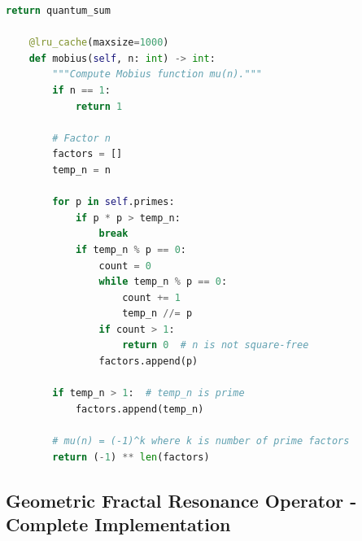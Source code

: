 \documentclass[11pt,a4paper]{article}
\theoremstyle{plain}
\theoremstyle{definition}
\theoremstyle{remark}
\begin{document}
\begin{lstlisting}[language=Python, caption=Complete Adelic Digital Sum with Optimizations]
        return quantum_sum
    
    @lru_cache(maxsize=1000)
    def mobius(self, n: int) -> int:
        """Compute Mobius function mu(n)."""
        if n == 1:
            return 1
            
        # Factor n
        factors = []
        temp_n = n
        
        for p in self.primes:
            if p * p > temp_n:
                break
            if temp_n % p == 0:
                count = 0
                while temp_n % p == 0:
                    count += 1
                    temp_n //= p
                if count > 1:
                    return 0  # n is not square-free
                factors.append(p)
                
        if temp_n > 1:  # temp_n is prime
            factors.append(temp_n)
            
        # mu(n) = (-1)^k where k is number of prime factors
        return (-1) ** len(factors)
\end{lstlisting}

\subsection{Geometric Fractal Resonance Operator - Complete Implementation}
\end{document}
